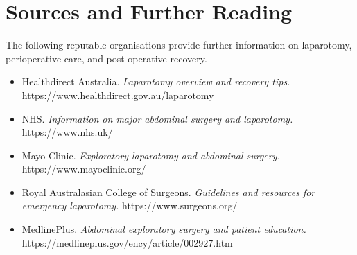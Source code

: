 \section*{Sources and Further Reading}
The following reputable organisations provide further information on laparotomy, perioperative care, and post-operative recovery.

\begin{itemize}
    \item Healthdirect Australia. \textit{Laparotomy overview and recovery tips.} https://www.healthdirect.gov.au/laparotomy
    \item NHS. \textit{Information on major abdominal surgery and laparotomy.} https://www.nhs.uk/
    \item Mayo Clinic. \textit{Exploratory laparotomy and abdominal surgery.} https://www.mayoclinic.org/
    \item Royal Australasian College of Surgeons. \textit{Guidelines and resources for emergency laparotomy.} https://www.surgeons.org/
    \item MedlinePlus. \textit{Abdominal exploratory surgery and patient education.} https://medlineplus.gov/ency/article/002927.htm
\end{itemize}
